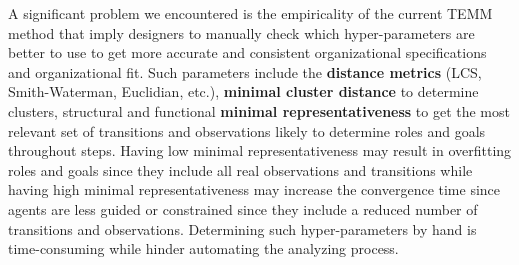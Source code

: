 A significant problem we encountered is the empiricality of the current TEMM method that imply designers to manually check which hyper-parameters are better to use to get more accurate and consistent organizational specifications and organizational fit. Such parameters include the \textbf{distance metrics} (LCS, Smith-Waterman, Euclidian, etc.), \textbf{minimal cluster distance} to determine clusters, structural and functional \textbf{minimal representativeness} to get the most relevant set of transitions and observations likely to determine roles and goals throughout steps. Having low minimal representativeness may result in overfitting roles and goals since they include all real observations and transitions while having high minimal representativeness may increase the convergence time since agents are less guided or constrained since they include a reduced number of transitions and observations. Determining such hyper-parameters by hand is time-consuming while hinder automating the analyzing process.

